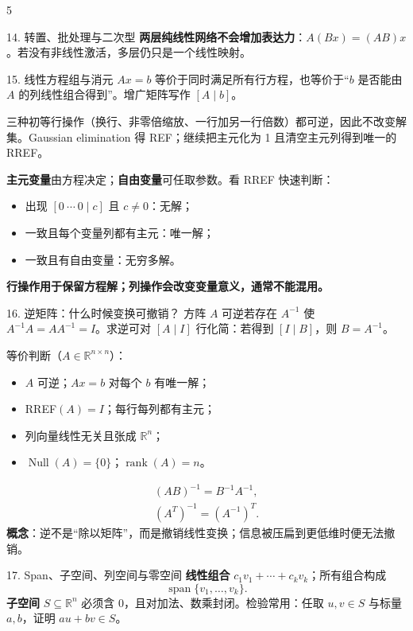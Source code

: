 \documentclass[a4paper,landscape,fontset=fandol]{ctexart}
\newcommand{\term}[1]{\textbf{\color{teal!80!black}#1}}
\newcommand{\warn}[1]{\textbf{\color{red}#1}}
\newcommand{\R}{\mathbb{R}}
\newcommand{\rank}{\operatorname{rank}}
\newcommand{\Span}{\operatorname{span}}
\begin{document}
\begin{multicols*}{5}
\begin{boxx}{14. 转置、批处理与二次型}
\term{两层纯线性网络不会增加表达力}：$A(Bx)=(AB)x$。若没有非线性激活，多层仍只是一个线性映射。
\end{boxx}

\begin{boxx}{15. 线性方程组与消元}
$Ax=b$ 等价于同时满足所有行方程，也等价于“$b$ 是否能由 $A$ 的列线性组合得到”。增广矩阵写作 $[A\mid b]$。

三种初等行操作（换行、非零倍缩放、一行加另一行倍数）都可逆，因此不改变解集。Gaussian elimination 得 REF；继续把主元化为 1 且清空主元列得到唯一的 RREF。

\term{主元变量}由方程决定；\term{自由变量}可任取参数。看 RREF 快速判断：
\begin{itemize}
  \item 出现 $[0\ \cdots\ 0\mid c]$ 且 $c\neq0$：无解；
  \item 一致且每个变量列都有主元：唯一解；
  \item 一致且有自由变量：无穷多解。
\end{itemize}
\warn{行操作用于保留方程解；列操作会改变变量意义，通常不能混用。}
\end{boxx}

\columnbreak

\begin{boxx}{16. 逆矩阵：什么时候变换可撤销？}
方阵 $A$ 可逆若存在 $A^{-1}$ 使 $A^{-1}A=AA^{-1}=I$。求逆可对 $[A\mid I]$ 行化简：若得到 $[I\mid B]$，则 $B=A^{-1}$。

等价判断（$A\in\R^{n\times n}$）：
\begin{itemize}
  \item $A$ 可逆；$Ax=b$ 对每个 $b$ 有唯一解；
  \item RREF$(A)=I$；每行每列都有主元；
  \item 列向量线性无关且张成 $\R^n$；
  \item $\operatorname{Null}(A)=\{0\}$；$\rank(A)=n$。
\end{itemize}
\[
\begin{gathered}
(AB)^{-1}=B^{-1}A^{-1},\\ (A^T)^{-1}=(A^{-1})^T.
\end{gathered}
\]
\term{概念}：逆不是“除以矩阵”，而是撤销线性变换；信息被压扁到更低维时便无法撤销。
\end{boxx}

\begin{boxx}{17. Span、子空间、列空间与零空间}
\term{线性组合} $c_1v_1+\cdots+c_kv_k$；所有组合构成
\[
\Span\{v_1,\ldots,v_k\}.
\]
\term{子空间} $S\subseteq\R^n$ 必须含 $0$，且对加法、数乘封闭。检验常用：任取 $u,v\in S$ 与标量 $a,b$，证明 $au+bv\in S$。


\end{boxx}
\end{multicols*}
\end{document}
